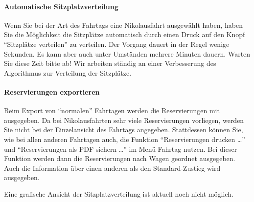 \paragraph{Automatische Sitzplatzverteilung}
Wenn Sie bei der Art des Fahrtags eine Nikolausfahrt ausgewählt haben, haben Sie die Möglichkeit die Sitzplätze automatisch durch einen Druck auf den Knopf "`Sitzplätze verteilen"' zu verteilen.
Der Vorgang dauert in der Regel wenige Sekunden.
Es kann aber auch unter Umständen mehrere Minuten dauern.
Warten Sie diese Zeit bitte ab!
Wir arbeiten ständig an einer Verbesserung des Algorithmus zur Verteilung der Sitzplätze.



\paragraph{Reservierungen exportieren}
Beim Export von "`normalen"' Fahrtagen werden die Reservierungen mit ausgegeben.
Da bei Nikolausfahrten sehr viele Reservierungen vorliegen, werden Sie nicht bei der Einzelansicht des Fahrtags angegeben.
Stattdessen können Sie, wie bei allen anderen Fahrtagen auch,
die Funktion "`Reservierungen drucken \dots"' und "`Reservierungen als PDF sichern \dots"' im Menü Fahrtag nutzen.
Bei dieser Funktion werden dann die Reservierungen nach Wagen geordnet ausgegeben.
Auch die Information über einen anderen als den Standard-Zustieg wird ausgegeben.

Eine grafische Ansicht der Sitzplatzverteilung ist aktuell noch nicht möglich.



